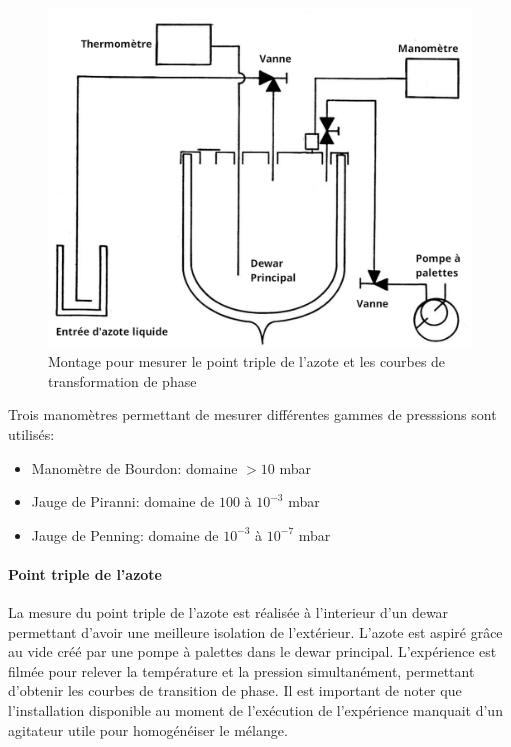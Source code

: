 \begin{minipage}{\textwidth}
\begin{figure}
    \includegraphics[width=\linewidth]{figures/montage_point_triple.png}
    \caption{Montage pour mesurer le point triple de l'azote et les courbes de transformation de phase}
    \label{fig:montagepointtriple}
\end{figure}

Trois manomètres permettant de mesurer différentes gammes de presssions sont utilisés:

\begin{itemize}
    \item Manomètre de Bourdon: domaine \(> 10\) \si{\milli\bar}
    \item Jauge de Piranni: domaine de \(100\) à \(10^{-3}\) \si{\milli\bar}
    \item Jauge de Penning: domaine de \(10^{-3}\) à \(10^{-7}\) \si{\milli\bar}
\end{itemize}

\paragraph*{Point triple de l'azote}
La mesure du point triple de l'azote est réalisée à l'interieur d'un dewar permettant d'avoir une meilleure isolation de l'extérieur. L'azote est aspiré grâce au vide créé par une pompe à palettes dans le dewar principal. L'expérience est filmée pour relever la température et la pression simultanément, permettant d'obtenir les courbes de transition de phase. Il est important de noter que l'installation disponible au moment de l'exécution de l'expérience manquait d'un agitateur utile pour homogénéiser le mélange. 
\end{minipage}

